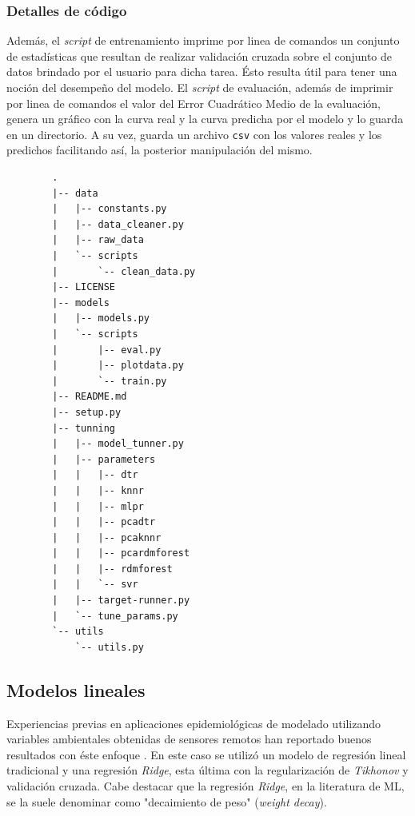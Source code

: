       \subsubsection{Detalles de código}

        \par Además, el
        \textit{script} de entrenamiento imprime por linea de comandos
        un conjunto de estadísticas que resultan de realizar validación
        cruzada sobre el conjunto de datos brindado por el usuario para
        dicha tarea. Ésto resulta útil para tener una noción del desempeño
        del modelo. El \textit{script} de evaluación, además de imprimir
        por linea de comandos el valor del Error Cuadrático Medio de la
        evaluación, genera un gráfico con la curva real y la curva predicha
        por el modelo y lo guarda en un directorio. A su vez, guarda un
        archivo \verb|csv| con los valores reales y los predichos facilitando
        así, la posterior manipulación del mismo.
        \begin{lstlisting}
        .
        |-- data
        |   |-- constants.py
        |   |-- data_cleaner.py
        |   |-- raw_data
        |   `-- scripts
        |       `-- clean_data.py
        |-- LICENSE
        |-- models
        |   |-- models.py
        |   `-- scripts
        |       |-- eval.py
        |       |-- plotdata.py
        |       `-- train.py
        |-- README.md
        |-- setup.py
        |-- tunning
        |   |-- model_tunner.py
        |   |-- parameters
        |   |   |-- dtr
        |   |   |-- knnr
        |   |   |-- mlpr
        |   |   |-- pcadtr
        |   |   |-- pcaknnr
        |   |   |-- pcardmforest
        |   |   |-- rdmforest
        |   |   `-- svr
        |   |-- target-runner.py
        |   `-- tune_params.py
        `-- utils
            `-- utils.py
        \end{lstlisting}


    \subsection{Modelos lineales}

      \par Experiencias previas en aplicaciones epidemiológicas de
        modelado utilizando variables ambientales obtenidas de sensores
        remotos han reportado buenos resultados con éste
        enfoque \cite{akodon_modeling, multilinear_apli, modis_data}.
        En este caso se utilizó un modelo de regresión lineal tradicional y
        una regresión \textit{Ridge}, esta última con la regularización de
        \textit{Tikhonov} y validación cruzada. Cabe destacar que la
        regresión \textit{Ridge}, en la literatura de ML, se la suele denominar
        como "decaimiento de peso" (\textit{weight decay}).

